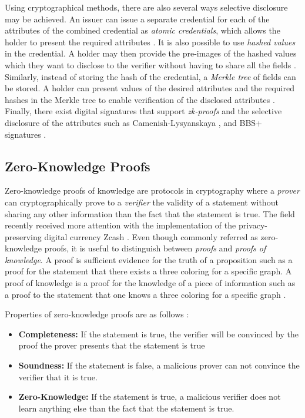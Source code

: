 Using cryptographical methods, there are also several ways selective disclosure may be achieved. An issuer can issue a separate credential for each of the attributes of the combined credential as \textit{atomic credentials}, which allows the holder to present the required attributes \parencite{Chadwick.2019}. It is also possible to use \textit{hashed values} in the credential. A holder may then provide the pre-images of the hashed values which they want to disclose to the verifier without having to share all the fields \parencite[961]{R.Mukta.2020}. Similarly, instead of storing the hash of the credential, a \textit{Merkle tree} of fields can be stored. A holder can present values of the desired attributes and the required hashes in the Merkle tree to enable verification of the disclosed attributes \parencite{Hitchens.9Eyl2018}. Finally, there exist digital signatures that support \textit{\acrfull{zk-proofs}} and the selective disclosure of the attributes such as Camenish-Lysyanskaya \parencite{camenisch2002signature}, and BBS+ signatures \parencite{boneh2004short, camenisch2016anonymous, lodder_looker_2020}.


\subsection{Zero-Knowledge Proofs}

Zero-knowledge proofs of knowledge are protocols in cryptography where a \textit{prover} can cryptographically prove to a \textit{verifier} the validity of a statement without sharing any other information than the fact that the statement is true. The field recently received more attention with the implementation of the privacy-preserving digital currency Zcash \parencite{E.BenSasson.2016}. Even though commonly referred as zero-knowledge proofs, it is useful to distinguish between \textit{proofs} and \textit{proofs of knowledge}. A proof is sufficient evidence for the truth of a proposition such as a proof for the statement that there exists a three coloring for a specific graph. A proof of knowledge is a proof for the knowledge of a piece of information such as a proof to the statement that one knows a three coloring for a specific graph \parencite{green_2017}. 

Properties of zero-knowledge proofs are as follows \parencite{Groth.2010}:
\begin{itemize}
  \item \textbf{Completeness:} If the statement is true, the verifier will be convinced by the proof the prover presents that the statement is true
  \item \textbf{Soundness:} If the statement is false, a malicious prover can not convince the verifier that it is true.
  \item \textbf{Zero-Knowledge:} If the statement is true, a malicious verifier does not learn anything else than the fact that the statement is true.
\end{itemize}

